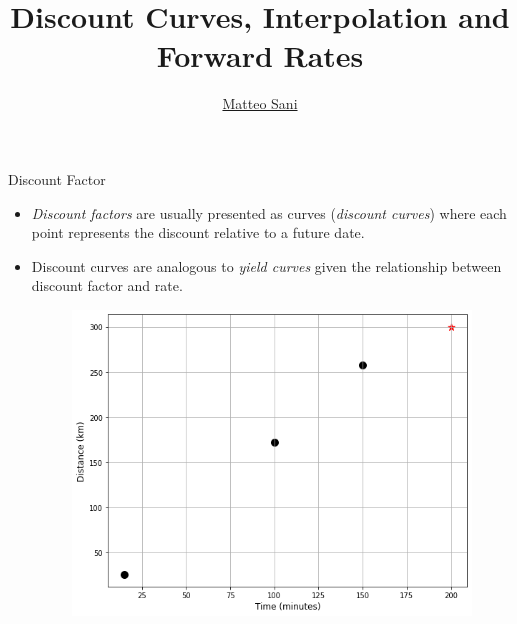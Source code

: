 \documentclass{beamer}
\title{Discount Curves, Interpolation and Forward Rates}
\author{\href{mailto:matteo.sani@unisi.it}{Matteo Sani}}
\begin{document}
\begin{frame}[plain]
	\maketitle
\end{frame}

\begin{frame}{Discount Factor}
  \begin{itemize}
    \item \emph{Discount factors} are usually presented as curves (\emph{discount curves}) where each point represents the discount relative to a future date.
    \item Discount curves are analogous to \emph{yield curves} given the relationship between discount factor and rate.
      \begin{figure}[h]
        \begin{center}
          \includegraphics[width=0.55\linewidth]{interp1}
        \end{center}
      \end{figure}
  \end{itemize}
\end{frame}
\end{document}
